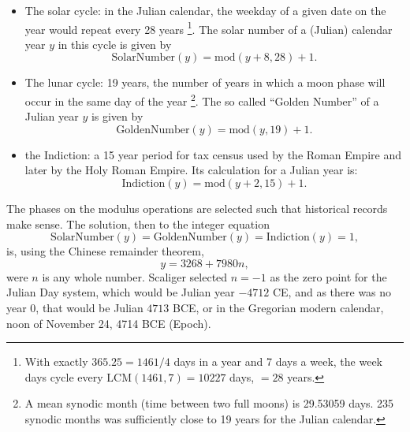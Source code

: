 	\begin{itemize}
		\item The solar cycle: in the Julian calendar, the weekday of a given date on the year would repeat every 28 years 
			\footnote{With exactly $365.25 = 1461/4$ days in a year and 7 days a week, the week days cycle every $\text{LCM}(1461,7)=10227$ days, $=28$ years.}. 
			The solar number of a (Julian) calendar year $y$ in this cycle is given by
			\begin{equation}
				\text{SolarNumber}(y) = \text{mod}(y+8,28) + 1.
			\end{equation}
			
		\item The lunar cycle: 19 years, the number of years in which a moon phase will occur in the same day of the year
			\footnote{A mean synodic month (time between two full moons) is 29.53059 days. 235 synodic months was sufficiently close to 19 years for the Julian calendar.}.
			The so called \enquote{Golden Number} of a Julian year $y$ is given by 
			\begin{equation}
				\text{GoldenNumber}(y) = \text{mod}(y,19)+ 1.
			\end{equation}
			
		\item the Indiction: a 15 year period for tax census used by the Roman Empire and later by the Holy Roman Empire. Its calculation for a Julian year is:
			\begin{equation}
				\text{Indiction}(y) = \text{mod}(y+2,15) + 1.
			\end{equation}
	\end{itemize}
	
	The phases on the modulus operations are selected such that historical records make sense. The solution, then to the integer equation 
	\begin{equation}
		\text{SolarNumber}(y) = \text{GoldenNumber}(y) = \text{Indiction}(y) = 1,
	\end{equation}
	is, using the Chinese remainder theorem,
	\begin{equation}
		y = 3268 + 7980 n,
	\end{equation}
	were $n$ is any whole number. Scaliger selected $n=-1$ as the zero point for the Julian Day system, which would be Julian year $-4712$ CE, 
	and as there was no year 0, that would be Julian $4713$ BCE, or in the Gregorian modern calendar, noon of November 24, 4714 BCE (Epoch).
	
	
